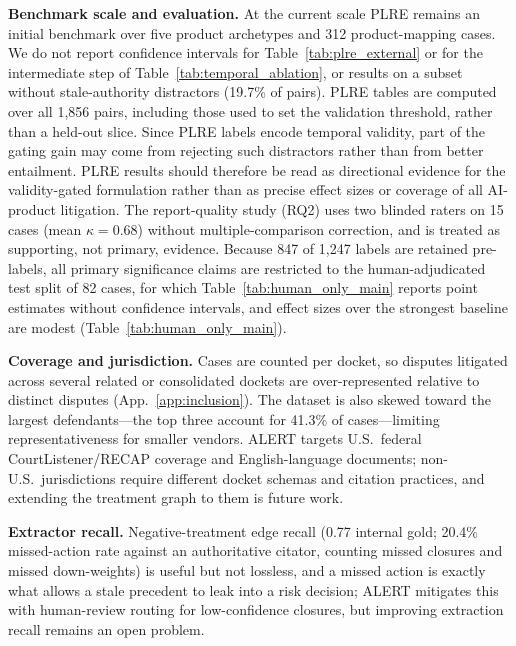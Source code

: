 \textbf{Benchmark scale and evaluation.} At the current scale PLRE remains an initial benchmark over five product archetypes and 312 product-mapping cases. We do not report confidence intervals for Table~\ref{tab:plre_external} or for the intermediate step of Table~\ref{tab:temporal_ablation}, or results on a subset without stale-authority distractors (19.7\% of pairs). PLRE tables are computed over all 1{,}856 pairs, including those used to set the validation threshold, rather than a held-out slice. Since PLRE labels encode temporal validity, part of the gating gain may come from rejecting such distractors rather than from better entailment. PLRE results should therefore be read as directional evidence for the validity-gated formulation rather than as precise effect sizes or coverage of all AI-product litigation. The report-quality study (RQ2) uses two blinded raters on 15 cases (mean $\kappa=0.68$) without multiple-comparison correction, and is treated as supporting, not primary, evidence. Because 847 of 1{,}247 labels are retained pre-labels, all primary significance claims are restricted to the human-adjudicated test split of 82 cases, for which Table~\ref{tab:human_only_main} reports point estimates without confidence intervals, and effect sizes over the strongest baseline are modest (Table~\ref{tab:human_only_main}).

\textbf{Coverage and jurisdiction.} Cases are counted per docket, so disputes litigated across several related or consolidated dockets are over-represented relative to distinct disputes (App.~\ref{app:inclusion}). The dataset is also skewed toward the largest defendants---the top three account for 41.3\% of cases---limiting representativeness for smaller vendors. ALERT targets U.S.\ federal CourtListener/RECAP coverage and English-language documents; non-U.S.\ jurisdictions require different docket schemas and citation practices, and extending the treatment graph to them is future work.

\textbf{Extractor recall.} Negative-treatment edge recall (0.77 internal gold; 20.4\% missed-action rate against an authoritative citator, counting missed closures and missed down-weights) is useful but not lossless, and a missed action is exactly what allows a stale precedent to leak into a risk decision; ALERT mitigates this with human-review routing for low-confidence closures, but improving extraction recall remains an open problem.
